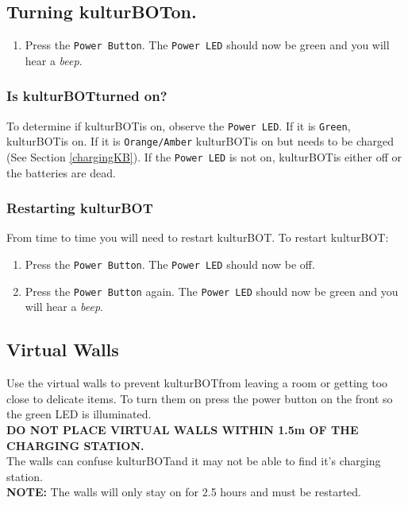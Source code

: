 \documentclass[]{article}
\newcommand{\kb}{kulturBOT}
\newcommand{\kbspace}{\kb \space}
\begin{document}
\subsection{Turning \kbspace on.}
\begin{enumerate}
\item Press the \texttt{Power Button}. The \texttt{Power LED} should now be green and you will hear a \textit{beep}.
\end{enumerate}

\subsubsection{Is \kbspace turned on?}
\label{isKbOn}
To determine if \kbspace is on, observe the \texttt{Power LED}. If it is \texttt{Green}, \kbspace is on. If it is \texttt{Orange/Amber} \kbspace is on but needs to be charged (See Section \ref{chargingKB}). If the \texttt{Power LED} is not on, \kbspace is either off or the batteries are dead.

\subsubsection{Restarting \kb}
\label{restartKb}
From time to time you will need to restart \kbspace. To restart \kb:

\begin{enumerate}
\item Press the \texttt{Power Button}. The \texttt{Power LED} should now be off.
\item Press the \texttt{Power Button} again. The \texttt{Power LED} should now be green and you will hear a \textit{beep}.
\end{enumerate}

\subsection{Virtual Walls}
Use the virtual walls to prevent \kbspace from leaving a room or getting too close to delicate items. To turn them on press the power button on the front so the green LED is illuminated.\\
\textbf{DO NOT PLACE VIRTUAL WALLS WITHIN 1.5m OF THE CHARGING STATION.} \\ The walls can confuse \kbspace and it may not be able to find it's charging station. 
\\

\textbf{NOTE: } The walls will only stay on for 2.5 hours and must be restarted.
\end{document}
